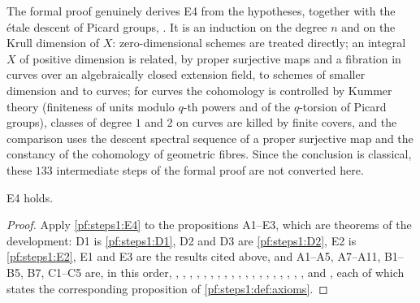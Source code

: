 \begin{remark}\label{pf:steps1:E4rem}
The formal proof genuinely derives E4 from the hypotheses, together with the \'etale descent of Picard groups,
. It is an induction on the degree $n$ and on the Krull dimension of
$X$: zero-dimensional schemes are treated directly; an integral $X$
of positive dimension is related, by proper surjective maps and a fibration in curves over an algebraically closed
extension field, to schemes of smaller dimension and to curves; for curves the cohomology is controlled by Kummer
theory (finiteness of units modulo $q$-th powers and of the $q$-torsion of Picard groups), classes of degree $1$ and
$2$ on curves are killed by finite covers, and the comparison uses the descent spectral sequence of a proper
surjective map and the constancy of the cohomology of geometric fibres. Since the conclusion is classical, these
$133$ intermediate steps of the formal proof are not converted here.
\end{remark}

\begin{corollary}[Finiteness]\label{pf:steps1:E4cor}
E4 holds. 
\end{corollary}

\begin{proof}
Apply \cref{pf:steps1:E4} to the propositions A1--E3, which are theorems of the development: D1 is
\cref{pf:steps1:D1}, D2 and D3 are \cref{pf:steps1:D2}, E2 is \cref{pf:steps1:E2}, E1 and E3 are the results cited
above, and A1--A5, A7--A11, B1--B5, B7, C1--C5 are, in this order,
,
, ,
,
,
,
,
,
,
,
,
,
, ,
,
,
,
,
,
 and
, each of which states the corresponding proposition of
\cref{pf:steps1:def:axioms}.
\end{proof}

